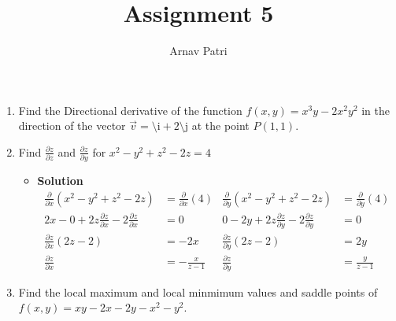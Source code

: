 \documentclass[12pt]{article}
\title{Assignment 5}
\author{Arnav Patri}
\newcommand{\pder}[2]{\frac{\partial #1}{\partial #2}}
\newcommand{\vi}{\text{\^\i}}
\newcommand{\vj}{\text{\^\j}}
\begin{document}
	\maketitle
		\begin{enumerate}
			\item
				Find the Directional derivative of the function $f(x, y) = x^3y - 2x^2y^2$ in the direction of the vector $\vec{v} = \vi + 2\vj$ at the point $P(1, 1)$.
			\item
				Find $\pder{z}{z}$ and $\pder{z}{y}$ for $x^2 - y^2 + z^2 - 2z = 4$
				\begin{itemize}[ ]
					\item \textbf{Solution}
						\begin{align*}
							\pder{}{x}(x^2 - y^2 + z^2 - 2z) &= \pder{}{x}(4) 
								&\pder{}{y}(x^2 - y^2 + z^2 - 2z)
									&= \pder{}{y}(4) \\
							2x - 0 + 2z\pder{z}{x} - 2\pder{z}{x} &= 0
								&0 - 2y + 2z\pder{z}{y} - 2\pder{z}{y}
									&= 0 \\
							\pder{z}{x}(2z - 2) &= -2x
								&\pder{z}{y}(2z - 2)
									&= 2y \\
							\pder{z}{x} &= -\frac{x}{z - 1}
								&\pder{z}{y}
									&= \frac{y}{z - 1}
						\end{align*}
				\end{itemize}
			\item
				Find the local maximum and local minmimum values and saddle points of $f(x, y) = xy - 2x - 2y - x^2 - y^2$.
		\end{enumerate}
\end{document}
